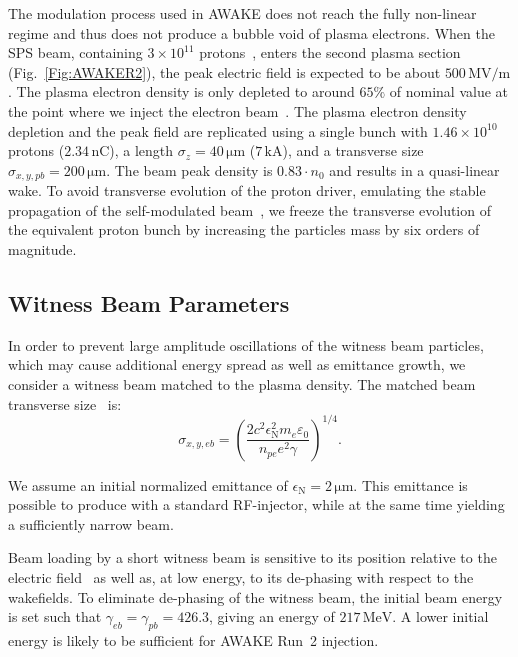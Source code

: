 \documentclass[aps,prstab,reprint,amsmath,amssymb,groupedaddress]{revtex4-1}
\newcommand{\unit}[1]{\,\mathrm{#1}}
\newcommand{\funit}[2]{\,\mathrm{#1}/\mathrm{#2}}
\newcommand{\nexp}[1]{\times 10^{#1}}
\begin{document}
The modulation process used in AWAKE does not reach the fully non-linear regime and thus does not produce a bubble void of plasma electrons. When the SPS beam, containing $3\nexp{11}$ protons~\cite{gschwendtner:2016}, enters the second plasma section (Fig.~\ref{Fig:AWAKER2}), the peak electric field is expected to be about $500\funit{MV}{m}$. The plasma electron density is only depleted to around $65\%$ of nominal value at the point where we inject the electron beam~\cite{awake_collaboration:2016}. The plasma electron density depletion and the peak field are replicated using a single bunch with $1.46\nexp{10}$ protons ($2.34\unit{nC}$), a length $\sigma_{z} = 40\unit{\mu m}$ ($7\unit{kA}$), and a transverse size $\sigma_{x,y,pb} = 200\unit{\mu m}$. The beam peak density is $0.83\cdot n_{0}$ and results in a quasi-linear wake. To avoid transverse evolution of the proton driver, emulating the stable propagation of the self-modulated beam~\cite{lotov:2011, lotov:2015, caldwell:2011}, we freeze the transverse evolution of the equivalent proton bunch by increasing the particles mass by six orders of magnitude.

\subsection{Witness Beam Parameters}\label{S:M:Setup}

In order to prevent large amplitude oscillations of the witness beam particles, which may cause additional energy spread as well as emittance growth, we consider a witness beam matched to the plasma density. The matched beam transverse size~\cite{esarey:1996} is:
\begin{equation}
    \sigma_{x,y,eb}=\left(\frac{2c^{2}\epsilon_{\mathrm{N}}^{2}m_{e}\varepsilon_{0}}{n_{pe}e^{2}\gamma}\right)^{1/4}. \label{EQ:Matched}
\end{equation}

We assume an initial normalized emittance of $\epsilon_{\mathrm{N}} = 2\unit{\mu m}$. This emittance is possible to produce with a standard RF-injector, while at the same time yielding a sufficiently narrow beam.

Beam loading by a short witness beam is sensitive to its position relative to the electric field~\cite{tzoufras:2009} as well as, at low energy, to its de-phasing with respect to the wakefields. To eliminate de-phasing of the witness beam, the initial beam energy is set such that $\gamma_{eb} = \gamma_{pb} = 426.3$, giving an energy of $217\unit{MeV}$. A lower initial energy is likely to be sufficient for AWAKE Run~2 injection.
\end{document}
